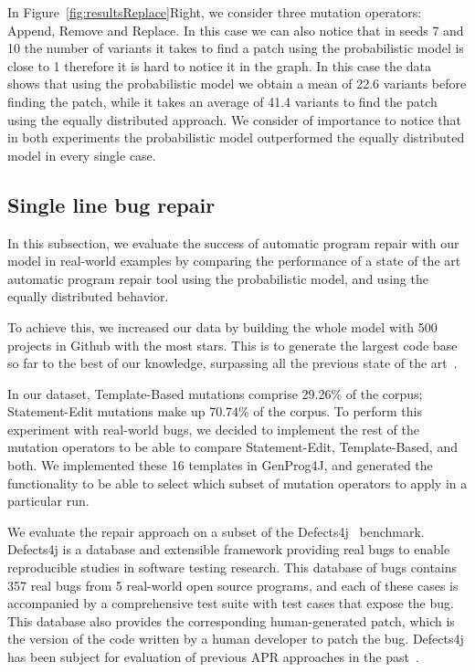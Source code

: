 \documentclass[conference]{IEEEtran}
\begin{document}

In Figure~\ref{fig:resultsReplace}Right, we consider three mutation operators: Append, 
Remove and Replace. In this case we can also notice that in seeds 7 and 10 the 
number of variants it takes to find a patch using the probabilistic model is 
close to 1 therefore it is hard to notice it in the graph. In this case the data 
shows that using the probabilistic model we obtain a mean of 22.6 variants 
before finding the patch, while it takes an average of 41.4 variants to find the 
patch using the equally distributed approach. We consider of importance to notice that in both experiments the probabilistic model outperformed the equally distributed model in every single case.

\subsection{Single line bug repair}
\label{sec:single}

In this subsection, we evaluate the success of automatic program repair with our model in real-world examples by comparing the performance of a state of the art automatic program repair tool using the probabilistic model, and using the equally distributed behavior.

To achieve this, we increased our data by building the whole model with 500 projects in Github with the most stars.
 This is to generate the largest code base so far to the best 
of our knowledge, surpassing all the previous state of the 
art~\cite{long15Proph,Soto15,zhong15,martinez15,xuan16}. 

In our dataset, Template-Based mutations comprise 29.26\% of the corpus; Statement-Edit mutations make up 70.74\% of the 
corpus. To perform this experiment with real-world bugs, we decided to implement the rest 
of the mutation operators to be able to compare Statement-Edit, Template-Based, and both. We implemented these 16 templates in GenProg4J, and generated the functionality 
to be able to select which subset of mutation operators to apply in a particular 
run.

We evaluate the repair approach on a subset of the Defects4j~\cite{just14}
benchmark.  Defects4j is a database and extensible 
framework providing real bugs to enable reproducible studies in software testing 
research. This database of bugs contains 357 real bugs from 5 
real-world open source programs, and each of these cases is accompanied by a 
comprehensive test suite with test cases that expose the bug. This database also provides 
the corresponding human-generated patch, which is the version of the code written by a human 
developer to patch the bug. Defects4j has been 
subject for evaluation of previous APR approaches in the past~\cite{Durieux15}.
\end{document}

